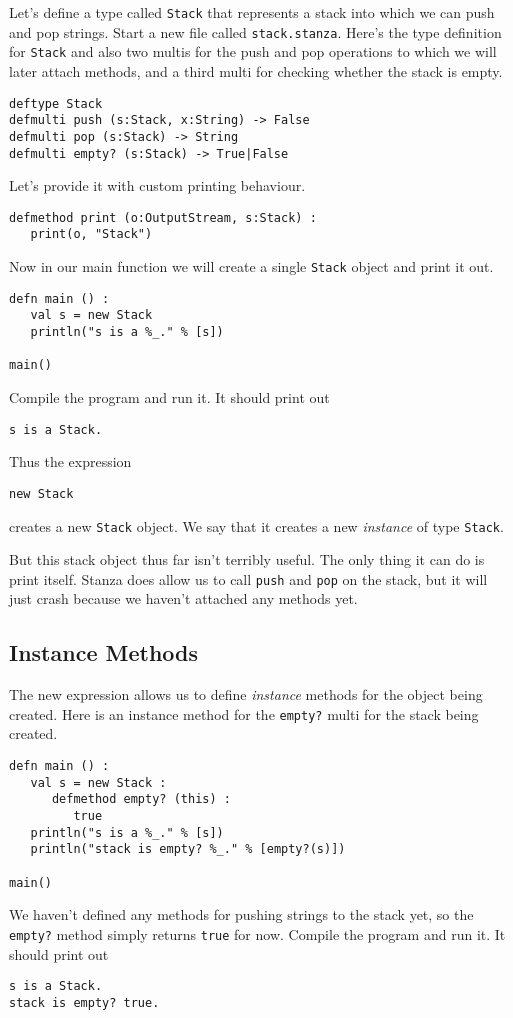\documentclass[10pt,oneside]{book}
\begin{document}
Let's define a type called \texttt{\frenchspacing Stack} that represents a stack into which we can push and pop strings. Start a new file called \texttt{\frenchspacing stack.stanza}. Here's the type definition for \texttt{\frenchspacing Stack} and also two multis for the push and pop operations to which we will later attach methods, and a third multi for checking whether the stack is empty.
\begin{lstlisting}
deftype Stack
defmulti push (s:Stack, x:String) -> False
defmulti pop (s:Stack) -> String
defmulti empty? (s:Stack) -> True|False
\end{lstlisting}

Let's provide it with custom printing behaviour.
\begin{lstlisting}
defmethod print (o:OutputStream, s:Stack) :
   print(o, "Stack")
\end{lstlisting}

Now in our main function we will create a single \texttt{\frenchspacing Stack} object and print it out.
\begin{lstlisting}
defn main () :
   val s = new Stack
   println("s is a %_." % [s])

main()
\end{lstlisting}

Compile the program and run it. It should print out
\begin{lstlisting}
s is a Stack.
\end{lstlisting}

Thus the expression
\begin{lstlisting}
new Stack
\end{lstlisting}
creates a new \texttt{\frenchspacing Stack} object. We say that it creates a new {\em instance} of type \texttt{\frenchspacing Stack}. 

But this stack object thus far isn't terribly useful. The only thing it can do is print itself. Stanza does allow us to call \texttt{\frenchspacing push} and \texttt{\frenchspacing pop} on the stack, but it will just crash because we haven't attached any methods yet. 

\subsection*{Instance Methods}
The new expression allows us to define {\em instance} methods for the object being created. Here is an instance method for the \texttt{\frenchspacing empty?} multi for the stack being created.
\begin{lstlisting}
defn main () :
   val s = new Stack :
      defmethod empty? (this) :
         true
   println("s is a %_." % [s])
   println("stack is empty? %_." % [empty?(s)])

main()
\end{lstlisting}
We haven't defined any methods for pushing strings to the stack yet, so the \texttt{\frenchspacing empty?} method simply returns \texttt{\frenchspacing true} for now. Compile the program and run it. It should print out
\begin{lstlisting}
s is a Stack.
stack is empty? true.
\end{lstlisting}
\end{document}
